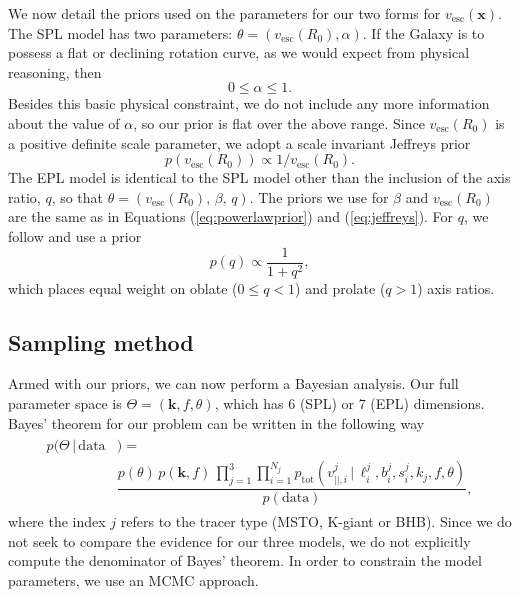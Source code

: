 \documentclass[useAMS,twocolumn,usenatbib]{mn2e}
\def\vesc{{v_\mathrm{esc}}}
\def\pos{{\boldsymbol{x}}}
\begin{document}
We now detail the priors used on the parameters for our two forms for $\vesc(\pos)$.
The SPL model has two parameters: $\theta = (\vesc(R_0),\alpha)$. 
If the Galaxy is to possess a flat or declining rotation curve, as we would expect from physical reasoning, then
%
\begin{equation}
0 \leq \alpha \leq 1.
\label{eq:powerlawprior}
\end{equation}
%
Besides this basic physical constraint, we do not include any more information about the value of $\alpha$, so our prior is flat over the above range. 
Since $\vesc(R_0)$ is a positive definite scale parameter, we adopt a scale invariant Jeffreys prior
%
\begin{equation}
p\left(\vesc(R_0)\right) \propto 1/\vesc(R_0).
\label{eq:jeffreys}
\end{equation}
%
The EPL model is identical to the SPL model other than the inclusion of the axis ratio, $q$, so that $\theta = (\vesc(R_0),\,\beta,\,q)$. 
The priors we use for $\beta$ and $\vesc(R_0)$ are the same as in Equations (\ref{eq:powerlawprior}) and (\ref{eq:jeffreys}).
For $q$, we follow \citet{Bo16} and use a prior
%
\begin{equation}
p(q) \propto \dfrac{1}{1+q^2},
\end{equation}
%
which places equal weight on oblate ($0\leq q <1$) and prolate ($q>1$) axis ratios.

\subsection{Sampling method}
\label{sec:sampling_method}

Armed with our priors, we can now perform a Bayesian analysis. 
Our full parameter space is $\Theta =(\boldsymbol{k},f,\theta)$, which has 6 (SPL) or 7 (EPL) dimensions. 
Bayes' theorem for our problem can be written in the following way
%
\begin{gather}
\begin{align}
p(\Theta \,| \,\mathrm{data}{}&) =  \nonumber \\
                    {}& \dfrac{p(\theta)\,p(\boldsymbol{k},f)\,\prod\limits_{j=1}^3
                    \prod\limits_{i=1}^{N_j}p_\mathrm{tot}(v_{||,i}^j \,|\, \ell_i^j,b_i^j,s_i^j,k_j,f,\theta)}{p(\mathrm{data})},
\end{align}
\label{eq:bayes}
\end{gather}
%
where the index $j$ refers to the tracer type (MSTO, K-giant or BHB). 
Since we do not seek to compare the evidence for our three models, we do not explicitly compute the denominator of Bayes' theorem. 
In order to constrain the model parameters, we use an MCMC approach.
\end{document}
